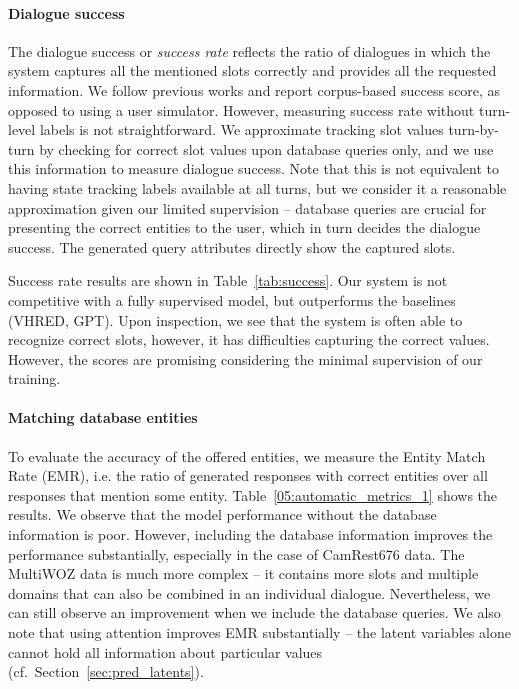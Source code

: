 \paragraph{Dialogue success}
The dialogue success or \emph{success rate} reflects the ratio of dialogues in which the system captures all the mentioned slots correctly and provides all the requested information.
We follow previous works \cite{nekvinda2021shades} and report corpus-based success score, as opposed to using a user simulator.
However, measuring success rate without turn-level labels is not straightforward. %
%
We approximate tracking slot values turn-by-turn by checking for correct slot values upon database queries only, and we use this information to measure dialogue success.
Note that this is not equivalent to having state tracking labels available at all turns, but we consider it a reasonable approximation given our limited supervision -- database queries are crucial for presenting the correct entities to the user, which in turn decides the dialogue success.
The generated query attributes directly show the captured slots.

Success rate results are shown in Table~\ref{tab:success}.
Our system is not competitive with a fully supervised model, but outperforms the baselines (VHRED, GPT).
Upon inspection,
we see that the system is often able to recognize correct slots, however, it has difficulties capturing the correct values.
However, the scores  are promising considering the minimal supervision of our training.

\paragraph{Matching database entities}
\label{sec:emr}
To evaluate the accuracy of the offered entities, we measure the Entity Match Rate (EMR), i.e. the ratio of generated responses with correct entities over all responses that mention some entity.
Table~\ref{05:automatic_metrics_1} shows  the results.
We observe that the model performance without the database information is poor.
However, including the database information improves the performance substantially, especially in the case of CamRest676 data.
The MultiWOZ data is much more complex -- it contains more slots and multiple domains that can also be combined in an individual dialogue.
Nevertheless, we can still observe an improvement when we include the database queries.
We also note that using attention improves EMR substantially -- the latent variables alone cannot hold all information about particular values (cf.~Section~\ref{sec:pred_latents}).

